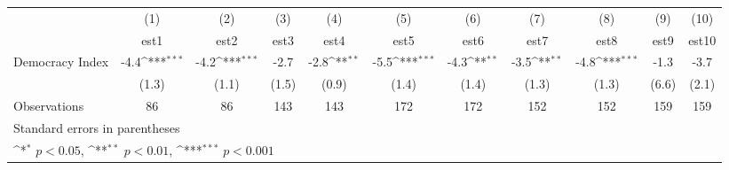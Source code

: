 {
\def\sym#1{\ifmmode^{#1}\else\(^{#1}\)\fi}
\begin{tabular}{l*{10}{c}}
\hline\hline
                    &\multicolumn{1}{c}{(1)}         &\multicolumn{1}{c}{(2)}         &\multicolumn{1}{c}{(3)}         &\multicolumn{1}{c}{(4)}         &\multicolumn{1}{c}{(5)}         &\multicolumn{1}{c}{(6)}         &\multicolumn{1}{c}{(7)}         &\multicolumn{1}{c}{(8)}         &\multicolumn{1}{c}{(9)}         &\multicolumn{1}{c}{(10)}         \\
                    &        est1         &        est2         &        est3         &        est4         &        est5         &        est6         &        est7         &        est8         &        est9         &       est10         \\
\hline
Democracy Index     &        -4.4\sym{***}&        -4.2\sym{***}&        -2.7         &        -2.8\sym{**} &        -5.5\sym{***}&        -4.3\sym{**} &        -3.5\sym{**} &        -4.8\sym{***}&        -1.3         &        -3.7         \\
                    &       (1.3)         &       (1.1)         &       (1.5)         &       (0.9)         &       (1.4)         &       (1.4)         &       (1.3)         &       (1.3)         &       (6.6)         &       (2.1)         \\
\hline
Observations        &          86         &          86         &         143         &         143         &         172         &         172         &         152         &         152         &         159         &         159         \\
\hline\hline
\multicolumn{11}{l}{\footnotesize Standard errors in parentheses}\\
\multicolumn{11}{l}{\footnotesize \sym{*} \(p<0.05\), \sym{**} \(p<0.01\), \sym{***} \(p<0.001\)}\\
\end{tabular}
}
